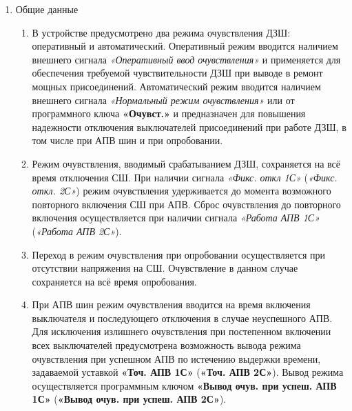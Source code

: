 \color{black}

\begin{enumerate}[label=\arabic{section}.\arabic{subsection}.\arabic{enumi}, labelsep=4pt, leftmargin=0pt, itemindent=57pt, itemsep=0pt, parsep=5pt] %


\item Общие данные

\begin{enumerate}[label=\arabic{section}.\arabic{subsection}.\arabic{enumi}.\arabic*, labelsep=4pt, leftmargin=0em, itemindent=65pt, parsep=0pt]

\item
В устройстве предусмотрено два режима очувствления ДЗШ: оперативный и автоматический.
Оперативный режим вводится наличием внешнего сигнала \textit{«Оперативный ввод очувствления»} и применяется для обеспечения требуемой чувствительности ДЗШ при выводе в ремонт мощных присоединений.
Автоматический режим вводится наличием внешнего сигнала \textit{«Нормальный режим очувствления»} или от программного ключа \textbf{«Очувст.»} и предназначен для повышения надежности отключения выключателей присоединений при работе ДЗШ, в том числе при АПВ шин и при опробовании.

\item
Режим очувствления, вводимый срабатыванием ДЗШ, сохраняется на всё время отключения СШ.
При наличии сигнала \textit{«Фикс. откл 1С»} (\textit{«Фикс. откл. 2С»}) режим очувствления удерживается до момента возможного повторного включения СШ при АПВ.
Сброс очувствления до повторного включения осуществляется при наличии сигнала \textit{«Работа АПВ 1С»} (\textit{«Работа АПВ 2С»}).

\item
Переход в режим очувствления при опробовании осуществляется при отсутствии напряжения на СШ.
Очувствление в данном случае сохраняется на всё время опробования.

\item
При АПВ шин режим очувствления вводится на время включения выключателя и последующего отключения в случае неуспешного АПВ.
Для исключения излишнего очувствления при постепенном включении всех выключателей предусмотрена возможность вывода режима очувствления при успешном АПВ по истечению выдержки времени, задаваемой уставкой \textbf{«Точ. АПВ 1С»} (\textbf{«Точ. АПВ 2С»}).
Вывод режима осуществляется программным ключом \textbf{«Вывод очув. при успеш. АПВ 1С»} (\textbf{«Вывод очув. при успеш. АПВ 2С»}).


\end{enumerate}
\end{enumerate}
